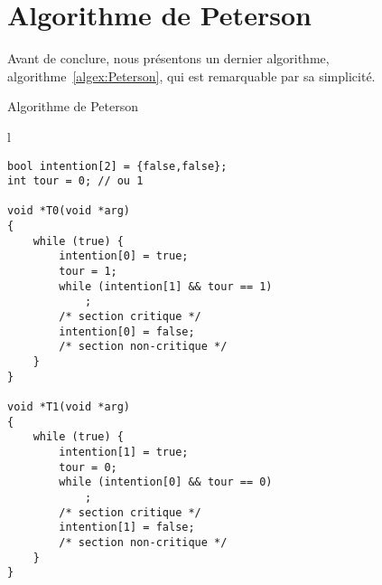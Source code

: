 \section{Algorithme de Peterson}
Avant de conclure, nous présentons un dernier algorithme, algorithme~\ref{algex:Peterson}, qui est remarquable par sa simplicité.
\begin{algorithm}[!ht]
\caption{Algorithme de Peterson}\label{algex:Peterson}
\begin{center}
\begin{tabular}{l}
\lstset{language=C++}
\begin{lstlisting}
bool intention[2] = {false,false};
int tour = 0; // ou 1

void *T0(void *arg)
{
	while (true) {
		intention[0] = true;
		tour = 1;
		while (intention[1] && tour == 1)
			;
		/* section critique */
		intention[0] = false;
		/* section non-critique */
	}
}

void *T1(void *arg)
{
	while (true) {
		intention[1] = true;
		tour = 0;
		while (intention[0] && tour == 0)
			;
		/* section critique */
		intention[1] = false;
		/* section non-critique */
	}
}
\end{lstlisting}
\end{tabular}
\end{center}
\end{algorithm}

